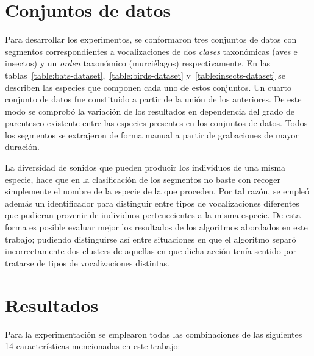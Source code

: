 \section{Conjuntos de datos}\label{sec:datasets}

Para desarrollar los experimentos, se conformaron tres conjuntos de datos con segmentos correspondientes a vocalizaciones de dos \textit{clases} taxonómicas (aves e insectos) y un \textit{orden} taxonómico (murciélagos) respectivamente.
En las tablas~\ref{table:bats-dataset},~\ref{table:birds-dataset} y~\ref{table:insects-dataset} se describen las especies que componen cada uno de estos conjuntos.
Un cuarto conjunto de datos fue constituido a partir de la unión de los anteriores.
De este modo se comprobó la variación de los resultados en dependencia del grado de parentesco existente entre las especies presentes en los conjuntos de datos.
Todos los segmentos se extrajeron de forma manual a partir de grabaciones de mayor duración.

La diversidad de sonidos que pueden producir los individuos de una misma especie, hace que en la clasificación de los segmentos no baste con recoger simplemente el nombre de la especie de la que proceden.
Por tal razón, se empleó además un identificador para distinguir entre tipos de vocalizaciones diferentes que pudieran provenir de individuos pertenecientes a la misma especie.
De esta forma es posible evaluar mejor los resultados de los algoritmos abordados en este trabajo;
pudiendo distinguirse así entre situaciones en que el algoritmo separó incorrectamente dos clusters de aquellas en que dicha acción tenía sentido por tratarse de tipos de vocalizaciones distintas.

\section{Resultados}\label{sec:results}

Para la experimentación se emplearon todas las combinaciones de las siguientes 14 características mencionadas en este trabajo:


